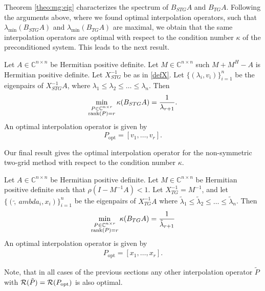 \documentclass[final]{siamltex}
\newcommand{\beqo}{\begin{eqnarray*}}
\newcommand{\beq}{\begin{eqnarray}}
\newcommand{\eeqo}{\end{eqnarray*}}
\newcommand{\eeq}{\end{eqnarray}}
\numberwithin{equation}{section}
\newcommand{\ran} {{\cal R}}
\newcommand{\Cnr}{\mathbb{C}^{n \times r}}
\newcommand{\inCnn}{\in \mathbb{C}^{n \times n}}
\begin{document}
Theorem \ref{theo:mg:eig} characterizes the  spectrum of $B_{STG}A$ and
$B_{TG}A$. Following the arguments above, where   we found optimal
interpolation operators, such that
$\lambda_{\min}(B_{STG}A)$ and $\lambda_{\min}(B_{TG}A)$ are maximal, we obtain
that the same interpolation operators are optimal with respect to the condition
number $\kappa$ of the preconditioned system. This leads to the next result.

 \begin{theorem}
Let  $A\inCnn$  be Hermitian positive definite. Let $ M \inCnn$ such $M + M^H -
A$ is Hermitian positive definite.
Let $X_{STG}^{-1}$  be as in \eqref{defX}.  
 Let $\{(\lambda_i,v_i)\}_{i=1}^n$ be the eigenpairs of $X_{STG}^{-1}A$, where
$
\lambda_1 \leq \lambda_2 \leq \ldots \leq  \lambda_n $. Then
\beq
\min_{\substack{P \in \Cnr \\ \rank(P)=r}} \kappa(B_{STG}A) =
\frac{1}{\lambda_{r+1}}.
\eeq
An optimal interpolation operator is given by 
\[
P_{\mathrm{opt}} = [v_{1}, \ldots , v_r].
\]
\end{theorem}
  
Our final result gives the optimal interpolation operator for the non-symmetric
two-grid
method with respect to the condition number $\kappa$.

\begin{theorem}
Let  $A\inCnn$  be Hermitian positive definite. Let $ M \inCnn$ be Hermitian
positive definite  such that $\rho(I - M^{-1}A) < 1.$
Let $X_{TG}^{-1} =  M^{-1}$, and let $\{(\tilde, \ ambda_i, x_i)\}_{i=1}^n$ be 
the eigenpairs of $X_{TG}^{-1}A$  where  $
\tilde \lambda_1 \leq \tilde \lambda_2 \leq \ldots \leq  \tilde \lambda_n $.
Then
\beqo
\min_{\substack{P \in \Cnr \\ \rank(P)=r}}  \kappa(B_{TG}A) = \frac{1}{\tilde
\lambda_{r+1}}
\eeqo
An optimal interpolation operator is given by 
\beqo
P_{\mathrm{opt}} = [x_{1}, \ldots , x_r].
\eeqo
\end{theorem}

Note, that  in all cases of the previous sections any other interpolation
operator $\tilde P$  with  $\ran (\tilde P) = \ran (P_{\mathrm{opt}})$ is also
optimal.
\end{document}
